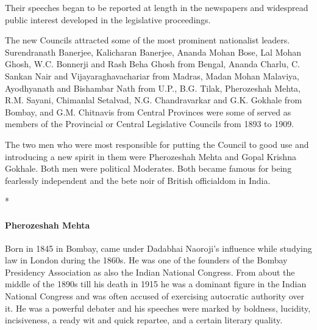 \begin{multicols}{2}
Their speeches began to be reported at length in the newspapers and widespread public interest developed in the legislative proceedings.

The new Councils attracted some of the most prominent nationalist leaders. Surendranath Banerjee, Kalicharan Banerjee, Ananda Mohan Bose, Lal Mohan Ghosh, W.C. Bonnerji and Rash Beha Ghosh from Bengal, Ananda Charlu, C. Sankan Nair and Vijayaraghavachariar from Madras, Madan Mohan Malaviya, Ayodhyanath and Bishambar Nath from U.P., B.G. Tilak, Pherozeshah Mehta, R.M. Sayani, Chimanlal Setalvad, N.G. Chandravarkar and G.K. Gokhale from Bombay, and G.M. Chitnavis from Central Provinces were some of served as members of the Provincial or Central Legislative Councils from 1893 to 1909.

The two men who were most responsible for putting the Council to good use and introducing a new spirit in them were Pherozeshah Mehta and Gopal Krishna Gokhale. Both men were political Moderates. Both became famous for being fearlessly independent and the bete noir of British officialdom in India.

\begin{center}*\end{center}

\paragraph{Pherozeshah Mehta} Born in 1845 in Bombay, came under Dadabhai Naoroji's influence while studying law in London during the 1860s. He was one of the founders of the Bombay Presidency Association as also the Indian National Congress. From about the middle of the 1890s till his death in 1915 he was a dominant figure in the Indian National Congress and was often accused of exercising autocratic authority over it. He was a powerful debater and his speeches were marked by boldness, lucidity, incisiveness, a ready wit and quick repartee, and a certain literary quality.


\end{multicols}
